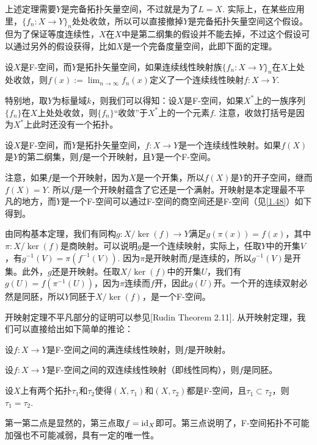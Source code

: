 上述定理需要$Y$是完备拓扑矢量空间，不过就是为了$L=X$. 实际上，在某些应用里，$\{f_n:X\to Y\}_n$处处收敛，所以可以直接撤掉$Y$是完备拓扑矢量空间这个假设。但为了保证等度连续性，$X$在$X$中是第二纲集的假设并不能去掉，不过这个假设可以通过另外的假设获得，比如$X$是一个完备度量空间，此即下面的定理。

\begin{thm}
设$X$是F-空间，而$Y$是拓扑矢量空间，如果连续线性映射族$\{f_n:X\to Y\}_n$在$X$上处处收敛，则$f(x):=\lim_{n\to \infty}f_n(x)$定义了一个连续线性映射$f:X\to Y$.
\end{thm}

特别地，取$Y$为标量域$k$，则我们可以得知：设$X$是F-空间，如果$X^*$上的一族序列$\{f_n\}$在$X$上处处收敛，则$\{f_n\}$“收敛”于$X^*$上的一个元素$f$. 注意，收敛打括号是因为$X^*$上此时还没有一个拓扑。

\begin{thm}[开映射定理]
设$X$是F-空间，而$Y$是拓扑矢量空间，$f:X\to Y$是一个连续线性映射。如果$f(X)$是$Y$的第二纲集，则$f$是一个开映射，且$Y$是一个F-空间。
\end{thm}

注意，如果$f$是一个开映射，因为$X$是一个开集，所以$f(X)$是$Y$的开子空间，继而$f(X)=Y$. 所以$f$是一个开映射蕴含了它还是一个满射。开映射是本定理最不平凡的地方，而$Y$是一个F-空间可以通过F-空间的商空间还是F-空间（见\ref{1.48}）如下得到。

由同构基本定理，我们有同构$g:X/\ker(f)\to Y$满足$g(\pi(x))=f(x)$，其中$\pi:X/\ker(f)$是商映射。可以说明$g$是一个连续映射，实际上，任取$Y$中的开集$V$，有$g^{-1}(V)=\pi(f^{-1}(V))$. 因为$\pi$是开映射而$f$是连续的，所以$g^{-1}(V)$是开集。此外，$g$还是开映射。任取$X/\ker(f)$中的开集$U$，我们有$g(U)=f(\pi^{-1}(U))$，因为$\pi$连续而$f$开，因此$g(U)$开。一个开的连续双射必然是同胚，所以$Y$同胚于$X/\ker(f)$，是一个F-空间。

开映射定理不平凡部分的证明可以参见[Rudin Theorem 2.11]. 从开映射定理，我们可以直接给出如下简单的推论：
\begin{compactenum}
\item 设$f:X\to Y$是F-空间之间的满连续线性映射，则$f$是开映射。
\item 设$f:X\to Y$是F-空间之间的双连续线性映射（即线性同构），则$f$是同胚。
\item 设$X$上有两个拓扑$\tau_1$和$\tau_2$使得$(X,\tau_1)$和$(X,\tau_2)$都是F-空间，且$\tau_1\subset \tau_2$，则$\tau_1=\tau_2$.
\end{compactenum}

第一第二点是显然的，第三点取$f=\operatorname{id}_X$即可。第三点说明了，F-空间拓扑不可能加强也不可能减弱，具有一定的唯一性。

